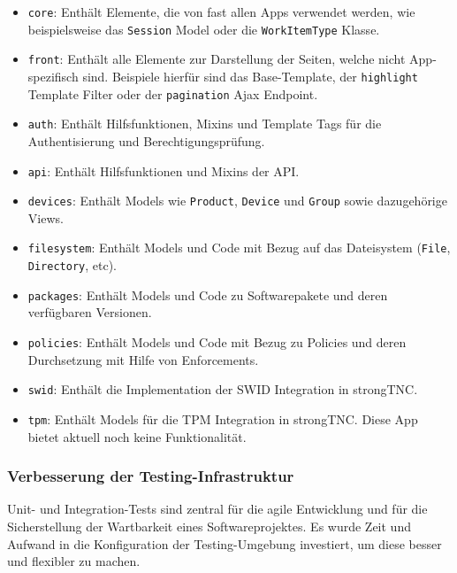 \begin{itemize}
	\item \texttt{core}: Enthält Elemente, die von fast allen Apps
	verwendet werden, wie beispielsweise das \texttt{Session} Model oder die
	\texttt{WorkItemType} Klasse.
		
	\item \texttt{front}: Enthält alle Elemente zur Darstellung der Seiten, welche
	nicht App-spezifisch sind. Beispiele hierfür sind das Base-Template, der
	\texttt{highlight} Template Filter oder der \texttt{pagination} Ajax Endpoint.
	
	\item \texttt{auth}: Enthält Hilfsfunktionen, Mixins und Template Tags für die Authentisierung und Berechtigungsprüfung.
	
	\item \texttt{api}: Enthält Hilfsfunktionen und Mixins der API.
	
	\item \texttt{devices}: Enthält Models wie \texttt{Product}, \texttt{Device} und \texttt{Group} sowie dazugehörige Views.
		
	\item \texttt{filesystem}: Enthält Models und Code mit Bezug auf das
	Dateisystem (\texttt{File}, \texttt{Directory}, etc).
	
	\item \texttt{packages}: Enthält Models und Code zu Softwarepakete
	und deren verfügbaren Versionen.
		
	\item \texttt{policies}: Enthält Models und Code mit Bezug zu Policies und
	deren Durchsetzung mit Hilfe von Enforcements.
		
	\item \texttt{swid}: Enthält die Implementation der SWID Integration
	in strongTNC.
		
	\item \texttt{tpm}: Enthält Models für die TPM Integration in strongTNC. Diese
	App bietet aktuell noch keine Funktionalität.
\end{itemize}

\subsubsection{Verbesserung der Testing-Infrastruktur}
\label{improvements:tests}

Unit- und Integration-Tests sind zentral für die agile Entwicklung und für die
Sicherstellung der Wartbarkeit eines Softwareprojektes. Es wurde Zeit und
Aufwand in die Konfiguration der Testing-Umgebung investiert, um diese besser
und flexibler zu machen.

